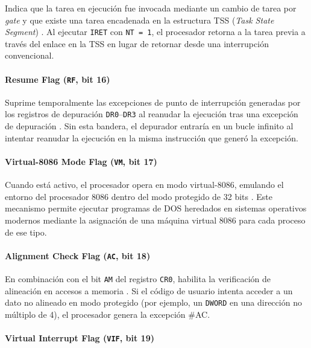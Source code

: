 \documentclass[a4paper,12pt]{article}
\begin{document}
Indica que la tarea en ejecución fue invocada mediante un cambio de tarea por \textit{gate} y que existe una tarea encadenada en la estructura TSS (\textit{Task State Segment}) \cite{stallings2019computer}. Al ejecutar \texttt{IRET} con \texttt{NT = 1}, el procesador retorna a la tarea previa a través del enlace en la TSS en lugar de retornar desde una interrupción convencional.

\paragraph*{Resume Flag (\texttt{RF}, bit 16)}

Suprime temporalmente las excepciones de punto de interrupción generadas por los registros de depuración \texttt{DR0}--\texttt{DR3} al reanudar la ejecución tras una excepción de depuración \cite{irvine2020assembly}. Sin esta bandera, el depurador entraría en un bucle infinito al intentar reanudar la ejecución en la misma instrucción que generó la excepción.

\paragraph*{Virtual-8086 Mode Flag (\texttt{VM}, bit 17)}

Cuando está activo, el procesador opera en modo virtual-8086, emulando el entorno del procesador 8086 dentro del modo protegido de 32 bits \cite{tanenbaum2013structured}. Este mecanismo permite ejecutar programas de DOS heredados en sistemas operativos modernos mediante la asignación de una máquina virtual 8086 para cada proceso de ese tipo.

\paragraph*{Alignment Check Flag (\texttt{AC}, bit 18)}

En combinación con el bit \texttt{AM} del registro \texttt{CR0}, habilita la verificación de alineación en accesos a memoria \cite{elahi2022computer}. Si el código de usuario intenta acceder a un dato no alineado en modo protegido (por ejemplo, un \texttt{DWORD} en una dirección no múltiplo de 4), el procesador genera la excepción \#AC.

\paragraph*{Virtual Interrupt Flag (\texttt{VIF}, bit 19)}
\end{document}

